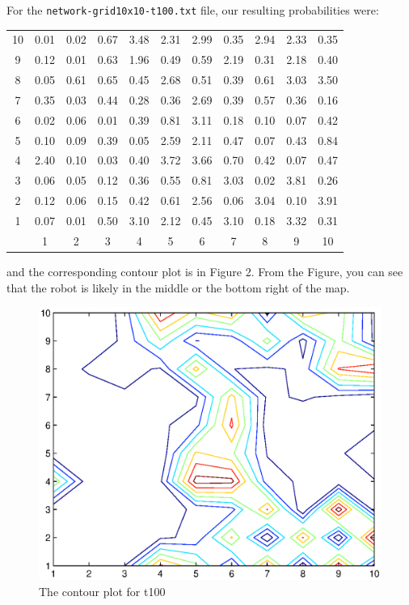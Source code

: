 \documentclass[11pt,a4paper]{article}
\begin{document}
\begin{enumerate}
		For the {\tt network-grid10x10-t100.txt} file, our resulting probabilities were:
		\begin{center}
			\begin{tabular}{|c|cccccccccc|}
				\hline
				10 & 0.01 & 0.02 & 0.67 & 3.48 & 2.31 & 2.99 & 0.35 & 2.94 & 2.33 & 0.35 \\
				9 & 0.12 & 0.01 & 0.63 & 1.96 & 0.49 & 0.59 & 2.19 & 0.31 & 2.18 & 0.40 \\
				8 & 0.05 & 0.61 & 0.65 & 0.45 & 2.68 & 0.51 & 0.39 & 0.61 & 3.03 & 3.50 \\
				7 & 0.35 & 0.03 & 0.44 & 0.28 & 0.36 & 2.69 & 0.39 & 0.57 & 0.36 & 0.16 \\
				6 & 0.02 & 0.06 & 0.01 & 0.39 & 0.81 & 3.11 & 0.18 & 0.10 & 0.07 & 0.42 \\
				5 & 0.10 & 0.09 & 0.39 & 0.05 & 2.59 & 2.11 & 0.47 & 0.07 & 0.43 & 0.84 \\
				4 & 2.40 & 0.10 & 0.03 & 0.40 & 3.72 & 3.66 & 0.70 & 0.42 & 0.07 & 0.47 \\
				3 & 0.06 & 0.05 & 0.12 & 0.36 & 0.55 & 0.81 & 3.03 & 0.02 & 3.81 & 0.26 \\
				2 & 0.12 & 0.06 & 0.15 & 0.42 & 0.61 & 2.56 & 0.06 & 3.04 & 0.10 & 3.91 \\
				1 & 0.07 & 0.01 & 0.50 & 3.10 & 2.12 & 0.45 & 3.10 & 0.18 & 3.32 & 0.31 \\
				\hline
				& 1 & 2 & 3 & 4 & 5 & 6 & 7 & 8 & 9 & 10 \\
				\hline
			\end{tabular}
		\end{center}
		and the corresponding contour plot is in Figure 2. From the Figure,
		you can see that the robot is likely in the middle or the bottom right of the map.
		\begin{figure}[h]
			\label{fig:contour100}
			\begin{center}
				\includegraphics[scale=.75]{t100-contour.eps}
			\end{center}
			\caption{The contour plot for t100}
		\end{figure}
		

\end{enumerate}
\end{document}

